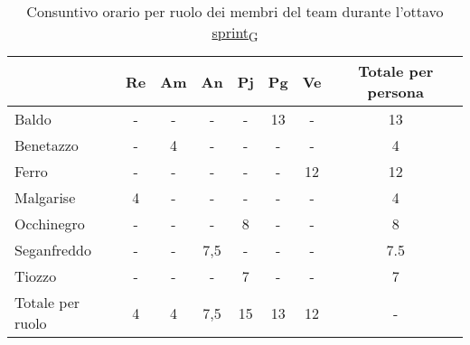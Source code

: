 \begin{table}[!h]
    \centering
    \begin{tabular}{ | l | c | c | c | c | c | c | c | }
        \hline
        \textbf{} & \textbf{Re} & \textbf{Am} &\textbf{An} & \textbf{Pj} & \textbf{Pg} & \textbf{Ve} & \textbf{Totale per persona} \\
        \hline			    %
        Baldo            &  -   &  -   &  -   &  -   & 13   &  -   & 13   \\
		Benetazzo        &  -   &  4   &  -   &  -   &  -   &  -   &  4   \\
		Ferro            &  -   &  -   &  -   &  -   &  -   & 12   & 12   \\
		Malgarise        &  4   &  -   &  -   &  -   &  -   &  -   &  4   \\
		Occhinegro       &  -   &  -   &  -   &  8   &  -   &  -   &  8   \\
		Seganfreddo      &  -   &  -   &  7,5 &  -   &  -   &  -   &  7.5 \\
		Tiozzo           &  -   &  -   &  -   &  7   &  -   &  -   &  7   \\
		\hline
		Totale per ruolo &  4   &  4   &  7,5 & 15   & 13   & 12   &  -   \\
        \hline
    \end{tabular}
    \caption{Consuntivo orario per ruolo dei membri del team durante l'ottavo \href{https://7last.github.io/docs/rtb/documentazione-interna/glossario\#sprint}{sprint\textsubscript{G}}}
\end{table}

